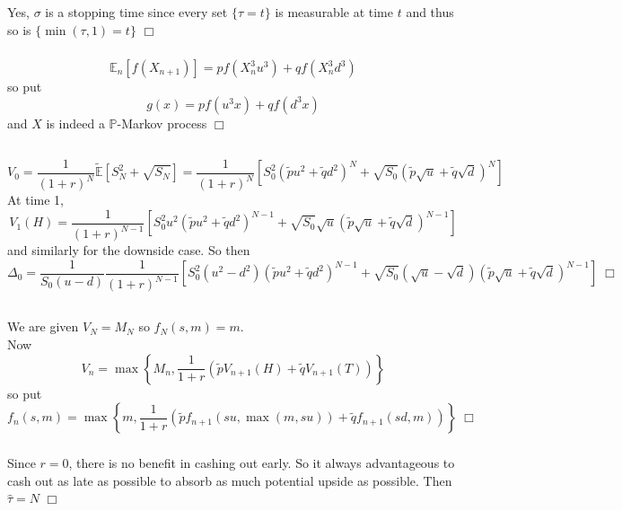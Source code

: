 \documentclass{article}
\begin{document}
\subsubsection{}
Yes, $\sigma$ is a stopping time since every set $\{\tau = t\}$ is measurable at time $t$ and thus so is $\{\min(\tau,1) = t\}$ $\Box$

\subsubsection{}
$$\mathbb{E}_n[f(X_{n+1})] = p f(X_n^3 u^3) + q f(X_n^3 d^3)$$
so put
$$g(x) = p f(u^3x) + q f(d^3x)$$
and $X$ is indeed a $\mathbb{P}$-Markov process $\Box$

\subsection{}
$$V_0 = \frac{1}{(1+r)^N} \widetilde{\mathbb{E}}[S_N^2 + \sqrt{S_N}] = \frac{1}{(1+r)^N}[S_0^2(\tilde{p}u^2 + \tilde{q}d^2)^N + \sqrt{S_0}(\tilde{p}\sqrt{u} + \tilde{q}\sqrt{d})^N]$$
At time 1,
$$V_1(H) = \frac{1}{(1+r)^{N-1}}[S_0^2u^2(\tilde{p}u^2 + \tilde{q}d^2)^{N-1} + \sqrt{S_0}\sqrt{u}(\tilde{p}\sqrt{u} + \tilde{q}\sqrt{d})^{N-1}]$$
and similarly for the downside case. So then
$$\Delta_0 = \frac{1}{S_0(u-d)}\frac{1}{(1+r)^{N-1}}[S_0^2(u^2-d^2)(\tilde{p}u^2 + \tilde{q}d^2)^{N-1} + \sqrt{S_0}(\sqrt{u}-\sqrt{d})(\tilde{p}\sqrt{u} + \tilde{q}\sqrt{d})^{N-1}] \; \Box$$

\subsection{}
\subsubsection{}
We are given $V_N = M_N$ so $f_N(s,m) = m$.\\
Now
$$V_n = \max\left\{M_n, \frac{1}{1+r} (\tilde{p}V_{n+1}(H) + \tilde{q}V_{n+1}(T)) \right\}$$
so put
$$f_n(s,m) = \max\left\{m, \frac{1}{1+r} (\tilde{p}f_{n+1}(su, \max(m, su)) + \tilde{q}f_{n+1}(sd, m)) \right\} \;\Box$$

\subsubsection{}
Since $r = 0$, there is no benefit in cashing out early. So it always advantageous to cash out as late as possible to absorb as much potential upside as possible. Then $\hat{\tau} = N$ $\Box$
\end{document}
